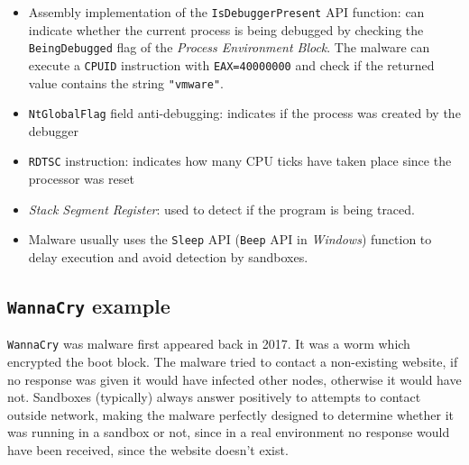 \begin{itemize}
   \item Assembly implementation of the \texttt{IsDebuggerPresent} API function:
   can indicate whether the current process is being debugged by checking the \texttt{BeingDebugged} flag of the \textit{Process Environment Block}.
   The malware can execute a \texttt{CPUID} instruction with \texttt{EAX=40000000} and check if the returned value contains the string \texttt{"vmware"}.
   \item \texttt{NtGlobalFlag} field anti-debugging:
   indicates if the process was
   created by the debugger
   \item \texttt{RDTSC} instruction:
   indicates how many CPU ticks have
   taken place since the processor was reset
   \item \textit{Stack Segment Register}: 
   used to detect if the program is being
   traced.
   \item Malware usually uses the \texttt{Sleep} API (\texttt{Beep} API in \textit{Windows}) function
   to delay execution and avoid detection by sandboxes.
\end{itemize}

\subsection{\texttt{WannaCry} example}
\texttt{WannaCry} was malware first appeared back in 2017.
It was a worm which encrypted the boot block.
The malware tried to contact a non-existing website,
if no response was given it would have infected other nodes, otherwise it would have not.
Sandboxes (typically) always answer positively to attempts to contact outside network, making the malware perfectly designed to determine whether it was running in a sandbox or not,
since in a real environment no response would have been received, since the website doesn't exist. 